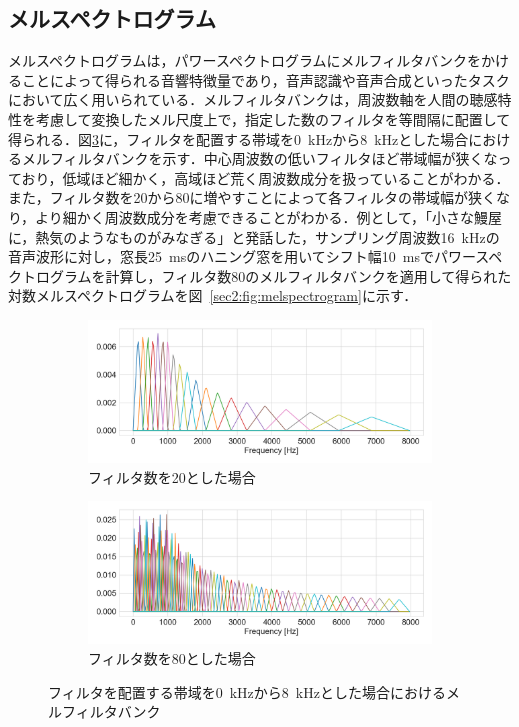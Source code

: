\subsection{メルスペクトログラム}
メルスペクトログラムは，パワースペクトログラムにメルフィルタバンクをかけることによって得られる音響特徴量であり，音声認識や音声合成といったタスクにおいて広く用いられている．メルフィルタバンクは，周波数軸を人間の聴感特性を考慮して変換したメル尺度上で，指定した数のフィルタを等間隔に配置して得られる．図\ref{sec2:fig:melfb}に，フィルタを配置する帯域を\SI{0}{\kHz}から\SI{8}{\kHz}とした場合におけるメルフィルタバンクを示す．中心周波数の低いフィルタほど帯域幅が狭くなっており，低域ほど細かく，高域ほど荒く周波数成分を扱っていることがわかる．また，フィルタ数を20から80に増やすことによって各フィルタの帯域幅が狭くなり，より細かく周波数成分を考慮できることがわかる．例として，「小さな鰻屋に，熱気のようなものがみなぎる」と発話した，サンプリング周波数\SI{16}{\kHz}の音声波形に対し，窓長\SI{25}{\ms}のハニング窓を用いてシフト幅\SI{10}{\ms}でパワースペクトログラムを計算し，フィルタ数80のメルフィルタバンクを適用して得られた対数メルスペクトログラムを図~\ref{sec2:fig:melspectrogram}に示す．

\begin{figure}[tb]
    \centering
    \begin{subfigure}[b]{1.0\textwidth}
        \centering
        \includegraphics[width=150mm]{./figure/sec2/melfb/onedim_20.png}
        \caption{フィルタ数を20とした場合}
        \label{sec2:fig:melfb_20}
    \end{subfigure}

    \vspace{0.5cm}

    \begin{subfigure}[b]{1.0\textwidth}
        \centering
        \includegraphics[width=150mm]{./figure/sec2/melfb/onedim_80.png}
        \caption{フィルタ数を80とした場合}
        \label{sec2:fig:melfb_80}
    \end{subfigure}
    \caption{フィルタを配置する帯域を\SI{0}{\kHz}から\SI{8}{\kHz}とした場合におけるメルフィルタバンク}
    \label{sec2:fig:melfb}
\end{figure}

